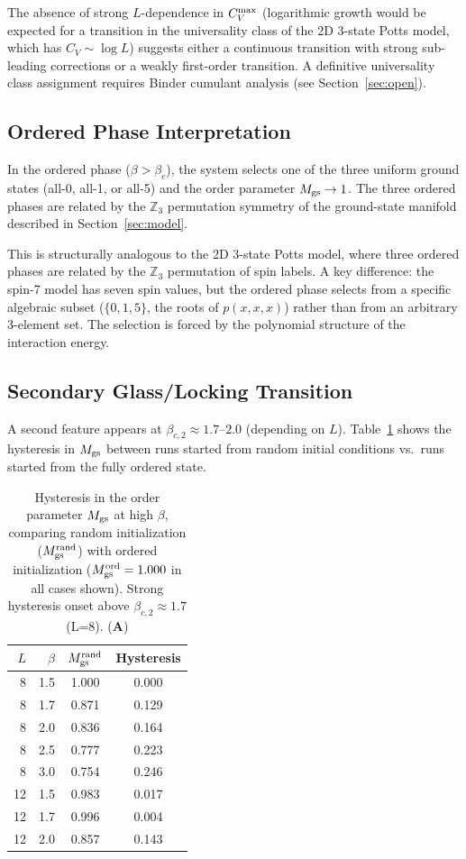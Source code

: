 \documentclass[11pt]{article}
\theoremstyle{remark}
\newcommand{\CatA}{\textbf{A}}
\begin{document}
The absence of strong $L$-dependence in $C_V^{\rm max}$ (logarithmic growth would
be expected for a transition in the universality class of the 2D 3-state Potts
model, which has $C_V \sim \log L$) suggests either a continuous transition with
strong sub-leading corrections or a weakly first-order transition.
A definitive universality class assignment requires Binder cumulant analysis
(see Section~\ref{sec:open}).

\subsection{Ordered Phase Interpretation}

In the ordered phase ($\beta > \beta_c$), the system selects one of the three
uniform ground states (all-0, all-1, or all-5) and the order parameter
$M_{\rm gs} \to 1$. The three ordered phases are related by the $\mathbb{Z}_3$
permutation symmetry of the ground-state manifold described in Section~\ref{sec:model}.

This is structurally analogous to the 2D 3-state Potts model, where three
ordered phases are related by the $\mathbb{Z}_3$ permutation of spin labels.
A key difference: the spin-7 model has seven spin values, but the ordered phase
selects from a specific algebraic subset ($\{0,1,5\}$, the roots of $p(x,x,x)$)
rather than from an arbitrary 3-element set. The selection is forced by the
polynomial structure of the interaction energy.

\subsection{Secondary Glass/Locking Transition}

A second feature appears at $\beta_{c,2} \approx 1.7$--$2.0$ (depending on $L$).
Table~\ref{tab:hysteresis} shows the hysteresis in $M_{\rm gs}$ between runs started
from random initial conditions vs.\ runs started from the fully ordered state.

\begin{table}[htb]
\centering
\caption{Hysteresis in the order parameter $M_{\rm gs}$ at high $\beta$, comparing
random initialization ($M_{\rm gs}^{\rm rand}$) with ordered initialization
($M_{\rm gs}^{\rm ord} = 1.000$ in all cases shown). Strong hysteresis onset
above $\beta_{c,2} \approx 1.7$ (L=8). (\CatA{})}
\label{tab:hysteresis}
\begin{tabular}{@{}rrcc@{}}
\toprule
$L$ & $\beta$ & $M_{\rm gs}^{\rm rand}$ & Hysteresis \\
\midrule
8 & 1.5 & 1.000 & 0.000 \\
8 & 1.7 & 0.871 & 0.129 \\
8 & 2.0 & 0.836 & 0.164 \\
8 & 2.5 & 0.777 & 0.223 \\
8 & 3.0 & 0.754 & 0.246 \\
12 & 1.5 & 0.983 & 0.017 \\
12 & 1.7 & 0.996 & 0.004 \\
12 & 2.0 & 0.857 & 0.143 \\
\bottomrule
\end{tabular}
\end{table}
\end{document}
